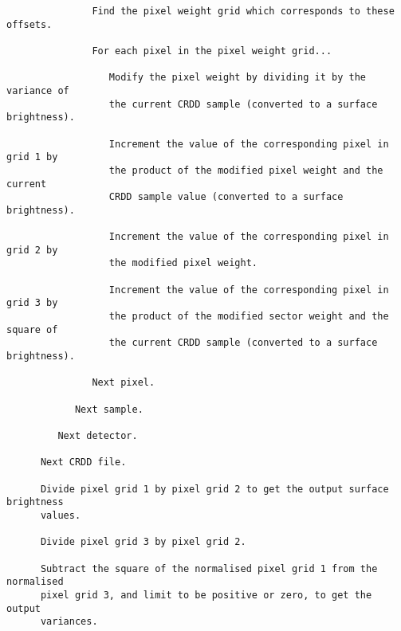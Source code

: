 \begin{verbatim}
               Find the pixel weight grid which corresponds to these offsets.

               For each pixel in the pixel weight grid...

                  Modify the pixel weight by dividing it by the variance of
                  the current CRDD sample (converted to a surface brightness).

                  Increment the value of the corresponding pixel in grid 1 by
                  the product of the modified pixel weight and the current
                  CRDD sample value (converted to a surface brightness).

                  Increment the value of the corresponding pixel in grid 2 by
                  the modified pixel weight.

                  Increment the value of the corresponding pixel in grid 3 by
                  the product of the modified sector weight and the square of
                  the current CRDD sample (converted to a surface brightness).

               Next pixel.

            Next sample.

         Next detector.

      Next CRDD file.

      Divide pixel grid 1 by pixel grid 2 to get the output surface brightness
      values.

      Divide pixel grid 3 by pixel grid 2.

      Subtract the square of the normalised pixel grid 1 from the normalised
      pixel grid 3, and limit to be positive or zero, to get the output
      variances.

\end{verbatim}

